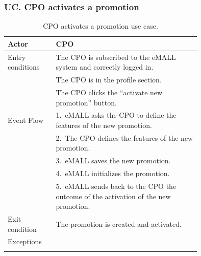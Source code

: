 \subsubsection*{UC\cuc . CPO activates a promotion}
\begin{center}
    \begin{longtable}{lp{0.75\linewidth}}
        \hline
        Actor            & CPO                                                                                 \\
        \hline
        Entry conditions & The CPO is subscribed to the eMALL system and correctly logged in.                  \\
        & The CPO is in the profile section.                                                  \\
        & The CPO clicks the “activate new promotion” button.                                 \\
        \hline
        Event Flow       & 1.\ eMALL asks the CPO to define the features of the new promotion.                 \\
        & 2.\ The CPO defines the features of the new promotion.                              \\
        & 3.\ eMALL saves the new promotion.                                                  \\
        & 4.\ eMALL initializes the promotion.                                                \\
        & 5.\ eMALL sends back to the CPO the outcome of the activation of the new promotion. \\
        \hline
        Exit condition   & The promotion is created and activated.                                             \\
        \hline
        Exceptions       &                                                                                     \\
        \hline
        \caption{CPO activates a promotion use case.}
        \label{tab: CPO_activates_promotion_use_case}
    \end{longtable}


\end{center}
